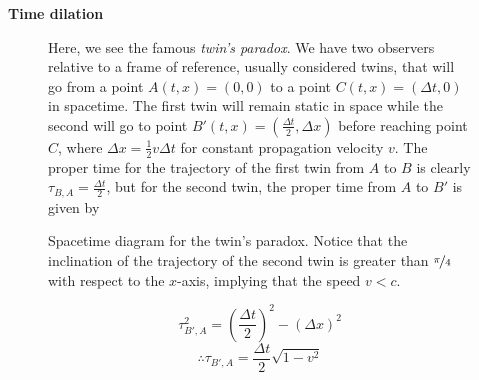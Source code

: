 \documentclass{article}
\begin{document}
 		\begin{exmp}
 			\textbf{Time dilation}
 			\begin{figure}[h]
 				\begin{minipage}{0.4\textwidth}
 					\center
 					\caption{Spacetime diagram for the twin's paradox. Notice that the inclination of the trajectory of the second twin is greater than $\nicefrac\pi4$ with respect to the $x$-axis, implying that the speed $v<c$.}
 				\end{minipage}
 				\hfill
 				\begin{minipage}{0.56\textwidth}
 					\begin{spacing}{1.5}
 						Here, we see the famous \textit{twin's paradox}. We have two observers relative to a frame of reference, usually considered twins, that will go from a point $A(t,x) = (0, 0)$ to a point $C(t,x)=(\Delta t, 0)$ in spacetime. The first twin will remain static in space while the second will go to point $B' (t,x) = \left(\frac{\Delta t}{2}, \Delta x\right)$ before reaching point $C$, where $\Delta x = \frac12 v \Delta t$ for constant propagation velocity $v$. The proper time for the trajectory of the first twin from $A$ to $B$ is clearly $\tau_{B,A} = \frac{\Delta t}{2}$, but for the second twin, the proper time from $A$ to $B'$ is given by
 					\end{spacing}
 				\end{minipage}
 			\end{figure} 
 			\vspace{-0.5cm}
 			$$ \tau_{B',A}^2 = \left(\frac{\Delta t}{2}\right)^2 - (\Delta x)^2 $$
 			\begin{equation}
 				\label{eq:RelativeProperTime}
 				\therefore \boxed{\tau_{B',A} = \frac{\Delta t}{2} \sqrt{1 - v^2} }
 			\end{equation}
 			

\end{exmp}
\end{document}
